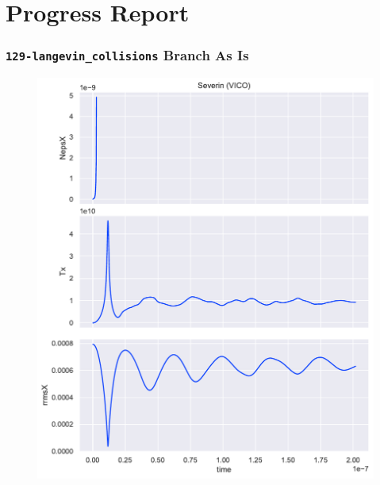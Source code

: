\documentclass[.08pt,aspectratio=169]{beamer}
\begin{document}

\section{Progress Report}
\begin{frame}
    \frametitle{\texttt{129-langevin\_collisions} Branch As Is}

\begin{figure}[!htb]
  \includegraphics[width=1.05\linewidth]{figures/severin_vanilla_vico.pdf}
  \label{fig:awesome_image1}
\endminipage\hfill
\end{figure}

\end{frame}
\end{document}
